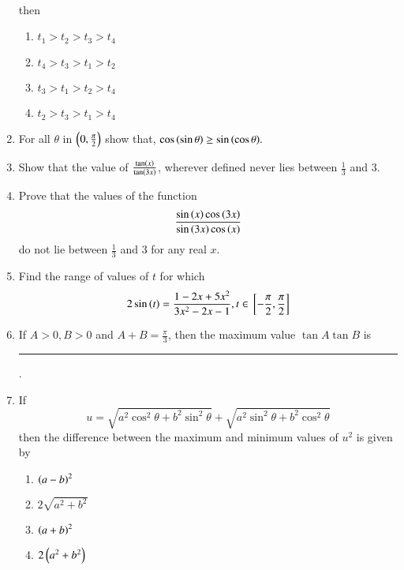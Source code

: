 \begin{enumerate}[label=\thesubsection.\arabic*,ref=\thesubsection.\theenumi]
\begin{align*}
\end{align*} then
\hfill{}
\begin{multicols}{4}
\begin{enumerate}
\item $t_1>t_2>t_3>t_4$
\item $t_4>t_3>t_1>t_2$
\item $t_3>t_1>t_2>t_4$
\item $t_2>t_3>t_1>t_4$
\end{enumerate}
\end{multicols}
\item For all $\theta$ in $\left(0, \frac{\pi}{2}\right)$ show that, $\cos\left(\sin\theta\right)\geq
\sin{\ensuremath{\left(\cos{\theta}\right)}}.$ \hfill{}
\item Show that the value of  $\frac{\tan \left(x\right)}{\tan \left(3x\right)}$, wherever defined never lies between $\frac{1}{3}$ and $3$.
\hfill{}
\item Prove that the values of the function 
$$
\frac{\sin \left(x\right) \cos \left(3x\right)}{\sin \left(3x\right) \cos \left(x\right)}
$$
do not lie between $\frac{1}{3}$ and $3$ for any real $x$.
\hfill{}
\item Find the range of values of $t$ for which 
$$
2\sin \left(t\right) = \frac{1-2x+5x^2}{3x^2-2x-1}
, t \in {}\left[-\frac{\pi}{2},\frac{\pi}{2}\right]
$$
\hfill{}
    \item If $A > 0, B>0$ and $A + B = \frac{\pi}{3}$, then the maximum value $\tan A \tan B$ is  
\rule{1cm}{0.1pt}.
        \hfill{}
%
\item If
$$u=\sqrt{a^2 \cos^2 \theta+b^2 \sin^2 \theta}+\sqrt{a^2 \sin^2 \theta+b^2 \cos^2 \theta}$$
then the difference between the  maximum and minimum values of $u^2$ is given by \hfill{}
\begin{multicols}{4}
\begin{enumerate}
\item $\left(a-b\right)^2$
\item $2\sqrt{a^2 +b^2}$
\item $\left(a+b\right)^2$
\item $2\left(a^2 +b^2\right)$
\end{enumerate}
\end{multicols}
\end{enumerate}
